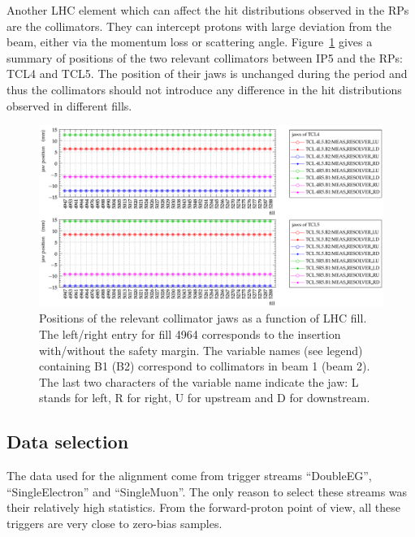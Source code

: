 \documentclass[TOTEM]{cern/cernphprep}
\begin{document}
Another LHC element which can affect the hit distributions observed in the RPs are the collimators. They can intercept protons with large deviation from the beam, either via the momentum loss or scattering angle. Figure~\ref{fig:cond_collimators} gives a summary of positions of the two relevant collimators between IP5 and the RPs: TCL4 and TCL5. The position of their jaws is unchanged during the period and thus the collimators should not introduce any difference in the hit distributions observed in different fills.

\begin{figure}[h!]
\vskip-1mm
\begin{center}
\includegraphics[width=0.9\hsize]{fig/conditions/collimator_positions_resolver.pdf}
\vskip-3mm
\caption{%
Positions of the relevant collimator jaws as a function of LHC fill. The left/right entry for fill 4964 corresponds to the insertion with/without the safety margin. The variable names (see legend) containing B1 (B2) correspond to collimators in beam 1 (beam 2). The last two characters of the variable name indicate the jaw: L stands for left, R for right, U for upstream and D for downstream.
}
\label{fig:cond_collimators}
\end{center}
\vskip-15mm
\end{figure}




\subsection{Data selection}
\label{s:phys-data_selection}

The data used for the alignment come from trigger streams ``DoubleEG'', ``SingleElectron'' and ``SingleMuon''. The only reason to select these streams was their relatively high statistics. From the forward-proton point of view, all these triggers are very close to zero-bias samples.
\end{document}
